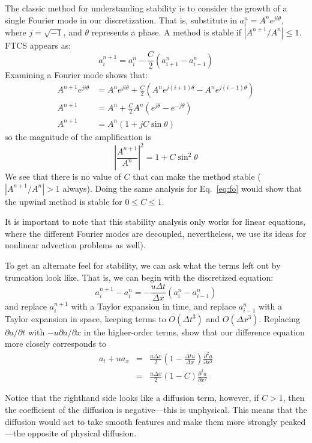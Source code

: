 The classic method for understanding stability is to consider the growth 
of a single Fourier mode in our discretization.  That is, substitute in
$a_i^n = A^n e^{ji\theta}$, where $j = \sqrt{-1}$, and $\theta$ represents a
phase.  A method is stable if $|A^{n+1}/A^n| \le 1$.  FTCS appears as:
\begin{equation}
  a_i^{n +1} = a_i^n - \frac{C}{2} (a_{i+1}^n - a_{i-1}^n)
\end{equation}
Examining a Fourier mode shows that:
\begin{align}
  A^{n+1}e^{ji\theta} &= A^n e^{ji\theta} + \frac{C}{2} \left (
      A^n e^{j(i+1)\theta} - A^n e^{j(i-1)\theta} \right ) \\
  A^{n+1} &= A^n  + \frac{C}{2} A^n \left ( e^{j\theta} - e^{-j\theta}\right ) \\
  A^{n+1} &= A^n \left ( 1 + j C \sin\theta \right )
\end{align}
so the magnitude of the amplification is
\begin{equation}
 \left | \frac{A^{n+1}}{A^n}\right |^2 = 1 + C\sin^2\theta
\end{equation}
We see that there is no value of $C$ that can make the method stable
($|A^{n+1}/A^n| > 1$ always).  Doing the same analysis for
Eq.~\ref{eq:fo} would show that the upwind method is stable for $0\le
C \le 1$. 

It is important to note that this stability analysis only works for
linear equations, where the different Fourier modes are decoupled,
nevertheless, we use its ideas for nonlinear advection problems as
well).

\begin{exercise}
{To get an alternate feel for stability, we can ask
  what the terms left out by truncation look like.  That is, we can
  begin with the discretized equation:
\begin{equation}
  a_i^{n+1} - a_i^n = -\frac{u \Delta t}{\Delta x} ( a_i^n - a_{i-1}^n )
\end{equation}
and replace $a_i^{n+1}$ with a Taylor expansion in time, and replace
$a_{i-1}^n$ with a Taylor expansion in space, keeping terms to
$O(\Delta t^3)$ and $O(\Delta x^3)$.  Replacing $\partial a/\partial t$
with $-u \partial a/ \partial x$ in the higher-order terms, show 
that our difference equation more closely corresponds to 
\begin{eqnarray}
a_t + u a_x &=& \frac{u \Delta x}{2} \left ( 1 - \frac{\Delta t u}{\Delta x} \right ) \frac{\partial^2 a}{\partial x^2} \\
            &=& \frac{u \Delta x}{2} (1 - C) \frac{\partial^2 a}{\partial x^2}
\end{eqnarray}

\noindent Notice that the righthand side looks like a diffusion term, however,
if $C > 1$, then the coefficient of the diffusion is negative---this is
unphysical.  This means that the diffusion would act to take smooth
features and make them more strongly peaked---the opposite of physical
diffusion.

}
\end{exercise}

